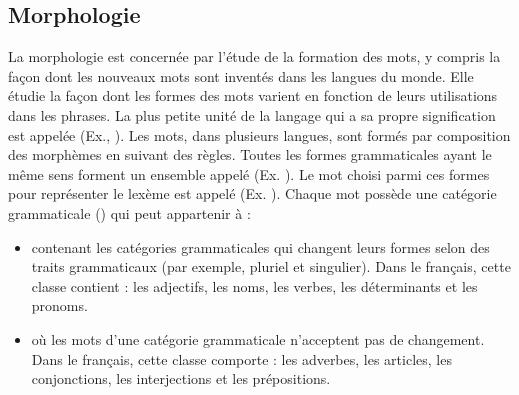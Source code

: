 \documentclass{KodeBook}
\begin{document}
\subsection{Morphologie}

La morphologie est concernée par l'étude de la formation des mots, y compris la façon dont les nouveaux mots sont inventés dans les langues du monde.
Elle étudie la façon dont les formes des mots varient en fonction de leurs utilisations dans les phrases.
La plus petite unité de la langage qui a sa propre signification est appelée  (Ex., ). 
Les mots, dans plusieurs langues, sont formés par composition des morphèmes en suivant des règles. 
Toutes les formes grammaticales ayant le même sens forment un ensemble appelé  (Ex. ). 
Le mot choisi parmi ces formes pour représenter le lexème est appelé  (Ex. ).
Chaque mot possède une catégorie grammaticale () qui peut appartenir à :
\begin{itemize}
	\item {} contenant les catégories grammaticales qui changent leurs formes selon des traits grammaticaux (par exemple, pluriel et singulier). 
	Dans le français, cette classe contient : les adjectifs, les noms, les verbes, les déterminants et les pronoms.
	\item {} où les mots d'une catégorie grammaticale n'acceptent pas de changement.
	Dans le français, cette classe comporte : les adverbes, les articles, les conjonctions, les interjections et les prépositions.
\end{itemize}
\end{document}
